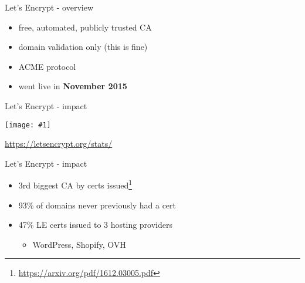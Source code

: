 \documentclass[ignorenonframetext,aspectratio=169]{beamer}
\makeatletter
\def\maxwidth{\ifdim\Gin@nat@width>\linewidth\linewidth\else\Gin@nat@width\fi}
\def\maxheight{\ifdim\Gin@nat@height>\textheight0.8\textheight\else\Gin@nat@height\fi}
\newcommand{\includegraphicsscaled}[1]{
    \texttt{[image: \#1]}
}
\makeatother
\begin{document}
\begin{frame}[plain]

\begin{center}
\def\svgwidth{.7\textwidth}

\end{center}

\end{frame}

\begin{frame}{Let's Encrypt - overview}

\begin{itemize}
\item
  free, automated, publicly trusted CA
\item
  domain validation only (this is fine)
\item
  ACME protocol
\item
  went live in \textbf{November 2015}
\end{itemize}

\end{frame}

\begin{frame}{Let's Encrypt - impact}

\begin{center}
\includegraphicsscaled{le-growth.png}
\end{center}

\tiny

\url{https://letsencrypt.org/stats/}

\end{frame}

\begin{frame}{Let's Encrypt - impact}

\begin{itemize}

\item 3rd biggest CA by certs
    issued\footnote{\url{https://arxiv.org/pdf/1612.03005.pdf}}

\item 93\% of domains never previously had a cert

\item 47\% LE certs issued to 3 hosting providers
  \begin{itemize}
  \item WordPress, Shopify, OVH
  \end{itemize}

\end{itemize}

\end{frame}
\end{document}
